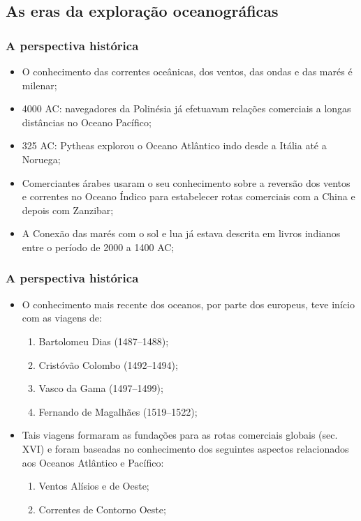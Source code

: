 \documentclass[14pt,xcolor=dvipsnames]{beamer}
\begin{document}
\subsection{As eras da exploração oceanográficas}
\begin{frame}
\footnotesize{
    \frametitle{A perspectiva histórica}
    \begin{itemize}[<+-| alert@+>]
    \item O conhecimento das correntes oceânicas, dos ventos, das ondas e das
          marés é milenar;
    \item 4000 AC: navegadores da Polinésia já efetuavam relações comerciais a
          longas distâncias no Oceano Pacífico;
    \item 325 AC: Pytheas explorou o Oceano Atlântico indo desde a Itália até a
          Noruega;
    \item Comerciantes árabes usaram o seu conhecimento sobre a reversão dos
          ventos e correntes no Oceano Índico para estabelecer rotas comerciais
          com a China e depois com Zanzibar;
    \item A Conexão das marés com o sol e lua já estava descrita em livros
          indianos entre o período de 2000 a 1400 AC;
    \end{itemize}
}
\end{frame}

\begin{frame}
    \frametitle{A perspectiva histórica}
    \begin{itemize}[<+-| alert@+>]
    \item O conhecimento mais recente dos oceanos, por parte dos europeus, teve
          início com as viagens de:
        \begin{enumerate}[<+-| alert@+>]
            \item Bartolomeu Dias (1487--1488);
            \item Cristóvão Colombo (1492--1494);
            \item Vasco da Gama (1497--1499);
            \item Fernando de Magalhães (1519--1522);
        \end{enumerate}
    \item Tais viagens formaram as fundações para as rotas comerciais globais
          (sec. XVI) e foram baseadas no conhecimento dos seguintes aspectos
          relacionados aos Oceanos Atlântico e Pacífico:
        \begin{enumerate}[<+-| alert@+>]
            \item Ventos Alísios e de Oeste;
            \item Correntes de Contorno Oeste;
                \end{enumerate}
    \end{itemize}
\end{frame}
\end{document}
